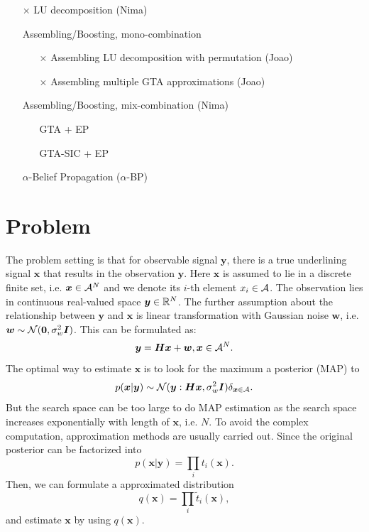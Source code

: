 \documentclass{article}
\begin{document}
\begin{itemize}
\item[$\times$] LU decomposition (Nima)
\item[\checkmark] Assembling/Boosting, mono-combination
  \begin{itemize}
  \item[$\times$] Assembling LU decomposition with permutation (Joao)
  \item[$\times$] Assembling multiple GTA approximations (Joao)
    
    
  \end{itemize}
\item[\checkmark] Assembling/Boosting, mix-combination (Nima)
  \begin{itemize}
  \item[\checkmark] GTA + EP
  \item[\checkmark] GTA-SIC + EP
  \end{itemize}
\item[\checkmark]$\alpha$-Belief Propagation ($\alpha$-BP)
\end{itemize}

\section{Problem}\label{sec:problem}
The problem setting is that for observable signal $\bm{y}$, there is a true underlining signal $\bm{x}$ that results in the observation $\bm{y}$. Here $\bm{x}$ is assumed to lie in a discrete finite set, i.e. $\bm{x} \in {\mathcal{A}}^{N}$ and we denote its $i$-th element $x_i \in \mathcal{A}$. The observation lies in continuous real-valued space $\bm{y}\in \mathbb{R}^N$. The further assumption about the relationship between $\bm{y}$ and $\bm{x}$ is linear transformation with Gaussian noise $\bm{w}$, i.e. $\bm{w}\sim \mathcal{N}(\bm{0}, \sigma_{w}^2 \bm{I})$. This can be formulated as:
\begin{equation}\label{eq:linear-model}
  \bm{y} = \bm{H} \bm{x} + \bm{w}, \bm{x} \in {\mathcal{A}}^{N}.
\end{equation}
The optimal way to estimate $\bm{x}$ is to look for the maximum a posterior (MAP) to
\begin{equation}
  p(\bm{x}|\bm{y}) \sim \mathcal{N}(\bm{y}: \bm{H}\bm{x}, \sigma_{w}^2\bm{I})\delta_{\bm{x}\in \mathcal{A}}.
\end{equation}
But the search space can be too large to do MAP estimation as the search space increases exponentially with length of $\bm{x}$, i.e. $N$.
To avoid the complex computation, approximation methods are usually carried out. Since the original posterior can be factorized into
\begin{equation}
  p(\bm{x}|\bm{y}) = \prod_i t_i(\bm{x}).
\end{equation}
Then, we can formulate a approximated distribution 
\begin{equation}\label{eq:apx-dist-q}
  q(\bm{x}) = \prod_i \tilde{t}_i(\bm{x}),
\end{equation}
and estimate $\bm{x}$ by using $q(\bm{x})$.
\end{document}
